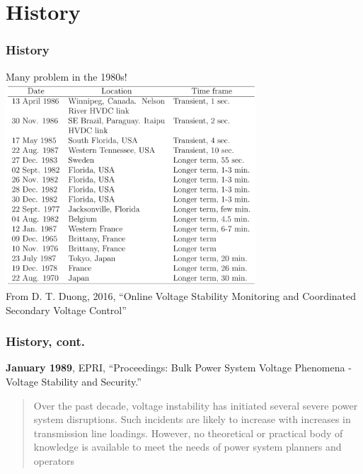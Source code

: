 \documentclass{beamer}
\begin{document}
\section{History}
\begin{frame}
  \frametitle{History}
Many problem in the 1980s!
\includegraphics[width=0.7\textwidth]{Figs/VoltageProblem.png}\\
{\footnotesize From D. T. Duong, 2016, ``Online Voltage Stability Monitoring and Coordinated Secondary Voltage Control''}\\
\end{frame}

\begin{frame}
  \frametitle{History, cont.}
\textbf{January 1989}, EPRI, “Proceedings: Bulk Power System Voltage Phenomena - Voltage Stability and Security.”
  \begin{quote}
    Over the past decade, voltage instability has initiated several severe power system disruptions. Such incidents are likely to increase with increases in transmission line loadings. However, no theoretical or practical body of knowledge is available to meet the needs of power system planners and operators
  \end{quote}
\end{frame}
\end{document}
